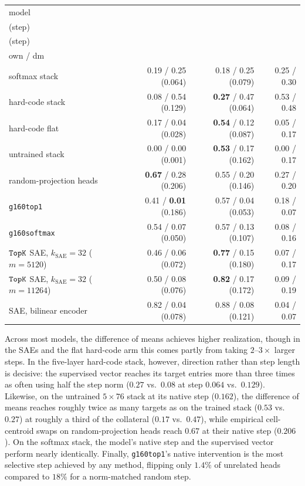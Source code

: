 \begin{center}\small\setlength{\tabcolsep}{4pt}
\begin{tabular}{@{}lrrr@{}}
\toprule
model & \stackhead[r]{own\\(step)} & \stackhead[r]{diff.\ of means\\(step)}
& \stackhead[r]{random:\\own / dm} \\
\midrule
softmax stack & 0.19 / 0.25 (0.064) & 0.18 / 0.25 (0.079) & 0.25 / 0.30 \\
hard-code stack & 0.08 / 0.54 (0.129) & \textbf{0.27} / 0.47 (0.064) & 0.53 / 0.48 \\
hard-code flat & 0.17 / 0.04 (0.028) & \textbf{0.54} / 0.12 (0.087) & 0.05 / 0.17 \\
untrained stack & 0.00 / 0.00 (0.001) & \textbf{0.53} / 0.17 (0.162) & 0.00 / 0.17 \\
random-projection heads & \textbf{0.67} / 0.28 (0.206) & 0.55 / 0.20 (0.146) & 0.27 / 0.20 \\
\texttt{g160top1} & 0.41 / \textbf{0.01} (0.186) & 0.57 / 0.04 (0.053) & 0.18 / 0.07 \\
\texttt{g160softmax} & 0.54 / 0.07 (0.050) & 0.57 / 0.13 (0.107) & 0.08 / 0.16 \\
$\mathop{\mathtt{TopK}}\limits$ SAE, $k_{\mathrm{SAE}}{=}32$ ($m{=}5120$) & 0.46 / 0.06 (0.072) & \textbf{0.77} / 0.15 (0.180) & 0.07 / 0.17 \\
$\mathop{\mathtt{TopK}}\limits$ SAE, $k_{\mathrm{SAE}}{=}32$ ($m{=}11264$) & 0.50 / 0.08 (0.076) & \textbf{0.82} / 0.17 (0.172) & 0.09 / 0.19 \\
SAE, bilinear encoder & 0.82 / 0.04 (0.078) & 0.88 / 0.08 (0.121) & 0.04 / 0.07 \\
\bottomrule
\end{tabular}
\end{center}

Across most models, the difference of means achieves higher realization,
though in the SAEs and the flat hard-code arm this comes partly from
taking $2$--$3\times$ larger steps. In the five-layer hard-code stack,
however, direction rather than step length is decisive: the supervised
vector reaches its target entries more than three times as often using
half the step norm ($0.27$ vs.\ $0.08$ at step $0.064$ vs.\ $0.129$).
Likewise, on the untrained $5\times76$ stack at its native step
($0.162$), the difference of means reaches roughly twice as many targets
as on the trained stack ($0.53$ vs.\ $0.27$) at roughly a third of the
collateral ($0.17$ vs.\ $0.47$), while empirical cell-centroid swaps on
random-projection heads reach $0.67$ at their native step ($0.206$). On
the softmax stack, the model's native step and the supervised vector
perform nearly identically. Finally, \texttt{g160top1}'s native
intervention is the most selective step achieved by any method, flipping
only $1.4\%$ of unrelated heads compared to $18\%$ for a norm-matched
random step.

